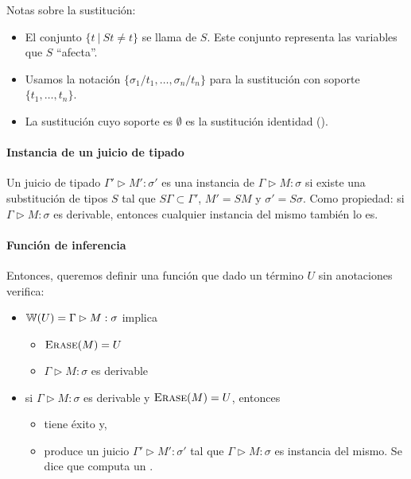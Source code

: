 Notas sobre la sustitución:

\begin{itemize}
  \item El conjunto $\{t\ |\ St \neq t\}$ se llama  de $S$. Este conjunto representa las variables que $S$ ``afecta''.
  \item Usamos la notación $\{\sigma_1/t_1,\dots,\sigma_n/t_n\}$ para la sustitución con soporte $\{t_1,\dots,t_n\}$.
  \item La sustitución cuyo soporte es $\emptyset$ es la sustitución identidad ().
\end{itemize}

\paragraph{Instancia de un juicio de tipado}

Un juicio de tipado $\Gamma' \rhd M' : \sigma'$ es una instancia de $\Gamma \rhd M : \sigma$ si existe una substitución de tipos $S$ tal que $S\Gamma \subset \Gamma'$, $M' = SM$ y $\sigma' = S\sigma$. Como propiedad: si $\Gamma \rhd M : \sigma$ es derivable, entonces cualquier instancia del mismo también lo es.

\paragraph{Función de inferencia \w{\cdot}}

Entonces, queremos definir una función \w{\cdot} que dado un término $U$ sin anotaciones verifica:
\begin{itemize}
  \item {} $\mathbb{W}(U) = \Gamma \rhd M : \sigma$ implica
    \begin{itemize}
      \item $\textsc{Erase}(M) = U$
      \item $\Gamma \rhd M : \sigma$ es derivable
    \end{itemize}
  \item {} si $\Gamma \rhd M : \sigma$ es derivable y $\textsc{Erase}(M) = U$, entonces
    \begin{itemize}
      \item {} tiene éxito y,
      \item produce un juicio $\Gamma' \rhd M' : \sigma'$ tal que $\Gamma \rhd M : \sigma$ es instancia del mismo. Se dice que \w{\cdot} computa un .
    \end{itemize}
\end{itemize}


